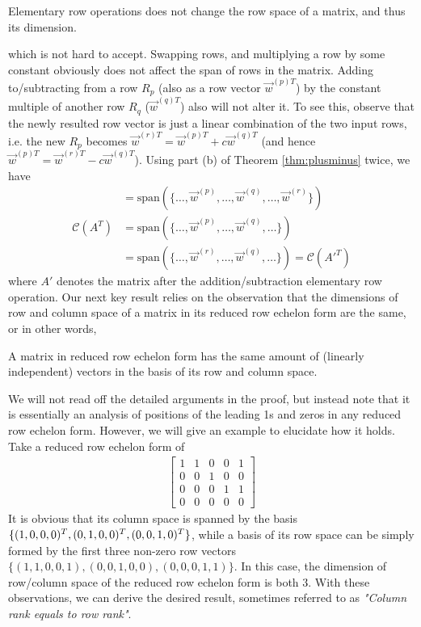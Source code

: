 \begin{proper}
\label{proper:elemrowoprowrank}
Elementary row operations does not change the row space of a matrix, and thus its dimension.
\end{proper}
which is not hard to accept. Swapping rows, and multiplying a row by some constant obviously does not affect the span of rows in the matrix. Adding to/subtracting from a row $R_p$ (also as a row vector $\vec{w}^{(p)T}$) by the constant multiple of another row $R_q$ ($\vec{w}^{(q)T}$) also will not alter it. To see this, observe that the newly resulted row vector is just a linear combination of the two input rows, i.e. the new $R_p$ becomes $\vec{w}^{(r)T} = \vec{w}^{(p)T} + c\vec{w}^{(q)T}$ (and hence $\vec{w}^{(p)T} = \vec{w}^{(r)T} - c\vec{w}^{(q)T}$). Using part (b) of Theorem \ref{thm:plusminus} twice, we have
\begin{align*}
&= \text{span}(\{\ldots, \vec{w}^{(p)}, \ldots, \vec{w}^{(q)}, \ldots, \vec{w}^{(r)}\}) \\
\mathcal{C}(A^T) &= \text{span}(\{\ldots, \vec{w}^{(p)}, \ldots, \vec{w}^{(q)}, \ldots\}) \\
&= \text{span}(\{\ldots, \vec{w}^{(r)}, \ldots, \vec{w}^{(q)}, \ldots\}) = \mathcal{C}(A'^T)
\end{align*}
where $A'$ denotes the matrix after the addition/subtraction elementary row operation. Our next key result relies on the observation that the dimensions of row and column space of a matrix in its reduced row echelon form are the same, or in other words,
\begin{proper}
\label{proper:rrefcolrowrank}
A matrix in reduced row echelon form has the same amount of (linearly independent) vectors in the basis of its row and column space.
\end{proper}
We will not read off the detailed arguments in the proof, but instead note that it is essentially an analysis of positions of the leading 1s and zeros in any reduced row echelon form. However, we will give an example to elucidate how it holds. Take a reduced row echelon form of
\begin{align*}
\begin{bmatrix}
1 & 1 & 0 & 0 & 1 \\
0 & 0 & 1 & 0 & 0 \\
0 & 0 & 0 & 1 & 1 \\
0 & 0 & 0 & 0 & 0 
\end{bmatrix}
\end{align*}
It is obvious that its column space is spanned by the basis $\{(1,0,0,0)^T, (0,1,0,0)^T, \\ (0,0,1,0)^T\}$, while a basis of its row space can be simply formed by the first three non-zero row vectors $\{(1,1,0,0,1), (0,0,1,0,0), (0,0,0,1,1)\}$. In this case, the dimension of row/column space of the reduced row echelon form is both $3$. With these observations, we can derive the desired result, sometimes referred to as \textit{"Column rank equals to row rank"}.

